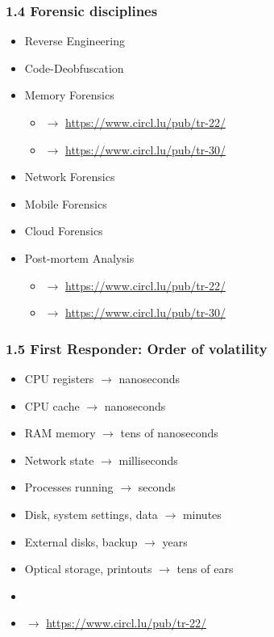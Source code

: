 \begin{frame}
  \frametitle{1.4 Forensic disciplines}
  \begin{itemize}
      \item Reverse Engineering
      \item Code-Deobfuscation
      \item Memory Forensics
        \begin{itemize}
            \item[] $\to$ \url{https://www.circl.lu/pub/tr-22/}
            \item[] $\to$ \url{https://www.circl.lu/pub/tr-30/}
        \end{itemize}
      \item Network Forensics
      \item Mobile Forensics
      \item Cloud Forensics
      \item Post-mortem Analysis
        \begin{itemize}
            \item[] $\to$ \url{https://www.circl.lu/pub/tr-22/}
            \item[] $\to$ \url{https://www.circl.lu/pub/tr-30/}
        \end{itemize}
  \end{itemize}
\end{frame}


\begin{frame}
  \frametitle{1.5 First Responder: Order of volatility}
  \begin{itemize}
      \item[] CPU registers $\to$ nanoseconds
      \item[] CPU cache $\to$ nanoseconds
      \item[] RAM memory $\to$ tens of nanoseconds
      \item[] Network state $\to$ milliseconds
      \item[] Processes running $\to$ seconds
      \item[] Disk, system settings, data $\to$ minutes
      \item[] External disks, backup $\to$ years
      \item[] Optical storage, printouts $\to$ tens of ears
      \item[] 
      \item[] $\to$ \url{https://www.circl.lu/pub/tr-22/}
  \end{itemize}
\end{frame}


